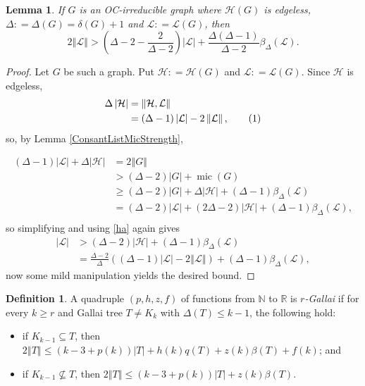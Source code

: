 \documentclass[12pt]{article}
\theoremstyle{plain}
\newtheorem{lem}[thm]{Lemma}
\theoremstyle{definition}
\newtheorem{defn}{Definition}
\theoremstyle{remark}
\newcommand{\fancy}[1]{\mathcal{#1}}
\newcommand{\IN}{\mathbb{N}}
\newcommand{\IR}{\mathbb{R}}
\renewcommand{\L}{\fancy{L}}
\newcommand{\HH}{\fancy{H}}
\newcommand{\card}[1]{\left|#1\right|}
\newcommand{\size}[1]{\left\Vert#1\right\Vert}
\newcommand{\parens}[1]{\left( #1 \right)}
\newcommand{\DefinedAs}{\mathrel{\mathop:}=}
\newcommand{\mic}{\operatorname{mic}}
\newcommand\numberthis{\addtocounter{equation}{1}\tag{\theequation}}
\begin{document}
\begin{lem}\label{LBound}
If $G$ is an OC-irreducible graph where $\HH(G)$ is edgeless, $\Delta \DefinedAs \Delta(G) = \delta(G) + 1$ and $\L\DefinedAs\L(G)$, then
\[2\size{\L} > \parens{\Delta-2 - \frac{2}{\Delta-2}}\card{\L} + \frac{\Delta(\Delta-1)}{\Delta-2}\beta_{\Delta}(\L).\]
\end{lem}
\begin{proof}
Let $G$ be such a graph. Put $\HH \DefinedAs \HH(G)$ and $\L \DefinedAs \L(G)$.  Since
$\HH$ is edgeless,
\begin{align*}
\Delta\card{\HH}&= \size{\HH, \L}\\
&=(\Delta-1)\card{\L} - 2\size{\L},\numberthis \label{ha}\\
\end{align*}
so, by Lemma \ref{ConsantListMicStrength},

\begin{align*}
(\Delta-1)\card{\L} + \Delta\card{\HH} &= 2\size{G}\\
&> (\Delta-2)\card{G} + \mic(G) \\
&\ge (\Delta-2)\card{G} + \Delta\card{\HH} + (\Delta-1)\beta_{\Delta}(\L)\\
&= (\Delta-2)\card{\L} + (2\Delta-2)\card{\HH} + (\Delta-1)\beta_{\Delta}(\L),\\
\end{align*}
so simplifying and using \eqref{ha} again gives
\begin{align*}
\card{\L} &> (\Delta-2)\card{\HH} + (\Delta-1)\beta_{\Delta}(\L)\\
&= \frac{\Delta-2}{\Delta}\parens{(\Delta-1)\card{\L} - 2\size{\L}} + (\Delta-1)\beta_{\Delta}(\L),
\end{align*}
now some mild manipulation yields the desired bound. 
\end{proof}

\begin{defn}
A quadruple $\parens{p,h,z,f}$ of functions from $\IN$ to $\IR$ is \emph{$r$-Gallai} if for every $k \ge r$ and Gallai tree $T \ne K_k$ with $\Delta(T) \le k-1$,
the following hold:
\begin{itemize}
\item if $K_{k-1} \subseteq T$, then $2\size{T} \le \parens{k-3 + p(k)}\card{T} + h(k)q(T) + z(k)\beta(T) + f(k)$; and
\item if $K_{k-1} \not\subseteq T$, then $2\size{T} \le \parens{k-3 + p(k)}\card{T} + z(k)\beta(T)$.
\end{itemize}
\end{defn}
\end{document}
